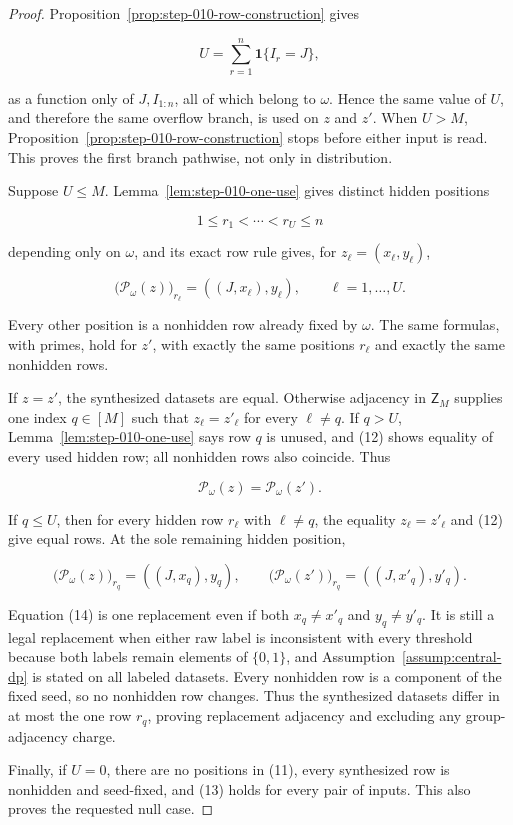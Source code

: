 \begin{proof}
Proposition~\ref{prop:step-010-row-construction} gives

\[
  U=\sum_{r=1}^n\mathbf1\{I_r=J\},
\tag{10}
\]

as a function only of \(J,I_{1:n}\), all of which belong to \(\omega\).
Hence the same value of \(U\), and therefore the same overflow branch, is
used on \(z\) and \(z'\).  When \(U>M\), Proposition~\ref{prop:step-010-row-construction} stops before either input
is read.  This proves the first branch pathwise, not only in distribution.

Suppose \(U\le M\).  Lemma~\ref{lem:step-010-one-use} gives distinct
hidden positions

\[
  1\le r_1<\cdots<r_U\le n
\tag{11}
\]

depending only on \(\omega\), and its exact row rule gives, for
\(z_\ell=(x_\ell,y_\ell)\),

\[
  \bigl(\mathcal P_\omega(z)\bigr)_{r_\ell}
  =((J,x_\ell),y_\ell),
  \qquad \ell=1,\ldots,U.
\tag{12}
\]

Every other position is a nonhidden row already fixed by \(\omega\).
The same formulas, with primes, hold for \(z'\), with exactly the same
positions \(r_\ell\) and exactly the same nonhidden rows.

If \(z=z'\), the synthesized datasets are equal.  Otherwise adjacency in
\(\mathsf Z_M\) supplies one index \(q\in[M]\) such that
\(z_\ell=z'_\ell\) for every \(\ell\ne q\).  If \(q>U\), Lemma~\ref{lem:step-010-one-use} says row \(q\) is unused, and (12)
shows equality of every used hidden row; all nonhidden rows also coincide.
Thus

\[
  \mathcal P_\omega(z)=\mathcal P_\omega(z').
\tag{13}
\]

If \(q\le U\), then for every hidden row \(r_\ell\) with \(\ell\ne q\),
the equality \(z_\ell=z'_\ell\) and (12) give equal rows.  At the sole
remaining hidden position,

\[
  \bigl(\mathcal P_\omega(z)\bigr)_{r_q}=((J,x_q),y_q),
  \qquad
  \bigl(\mathcal P_\omega(z')\bigr)_{r_q}=((J,x'_q),y'_q).
\tag{14}
\]

Equation (14) is one replacement even if both \(x_q\ne x'_q\) and
\(y_q\ne y'_q\).  It is still a legal replacement when either raw label
is inconsistent with every threshold because both labels remain elements
of \(\{0,1\}\), and Assumption~\ref{assump:central-dp} is stated on all
labeled datasets.  Every nonhidden row is a component of the fixed seed,
so no nonhidden row changes.  Thus the synthesized datasets differ in at
most the one row \(r_q\), proving replacement adjacency and excluding any
group-adjacency charge.

Finally, if \(U=0\), there are no positions in (11), every synthesized
row is nonhidden and seed-fixed, and (13) holds for every pair of inputs.
This also proves the requested null case. \end{proof}

